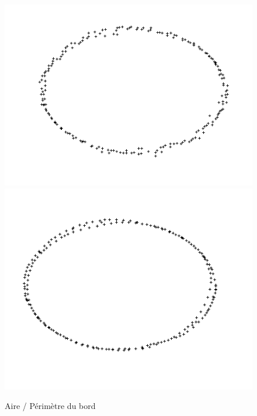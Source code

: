 \documentclass{beamer}
\begin{document}
\begin{frame}
\begin{figure}
        \includegraphics[scale=0.22]{img/ellipse-200-noised-var-1-perimeter}
        \includegraphics[scale=0.22]{img/ellipse-noised-perimeter-7-2}
        \caption{Aire / Périmètre du bord}
    \end{figure}
\end{frame}
\end{document}
